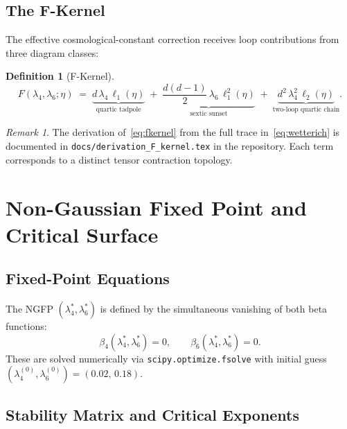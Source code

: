 \documentclass[11pt,a4paper]{article}
\theoremstyle{definition}
\newtheorem{definition}{Definition}[section]
\theoremstyle{plain}
\theoremstyle{remark}
\newtheorem{remark}{Remark}[section]
\begin{document}
\subsection{The F-Kernel}
\label{sec:fkernel}

The effective cosmological-constant correction receives loop
contributions from three diagram classes:

\begin{definition}[F-Kernel]
\label{def:fkernel}
\begin{equation}
  F(\lambda_4,\lambda_6;\eta)
  \;=\;
  \underbrace{d\,\lambda_4\,\ell_1(\eta)}_{\text{quartic tadpole}}
  \;+\;
  \underbrace{\frac{d(d-1)}{2}\,\lambda_6\,\ell_1^2(\eta)}_{\text{sextic sunset}}
  \;+\;
  \underbrace{d^2\,\lambda_4^2\,\ell_2(\eta)}_{\text{two-loop quartic chain}}.
  \label{eq:fkernel}
\end{equation}
\end{definition}

\begin{remark}
The derivation of~\eqref{eq:fkernel} from the full trace
in~\eqref{eq:wetterich} is documented in
\texttt{docs/derivation\_F\_kernel.tex} in the repository.
Each term corresponds to a distinct tensor contraction topology.
\end{remark}


\section{Non-Gaussian Fixed Point and Critical Surface}
\label{sec:ngfp}

\subsection{Fixed-Point Equations}

The NGFP $(\lambda_4^*,\lambda_6^*)$ is defined by the simultaneous
vanishing of both beta functions:
\begin{equation}
  \beta_4(\lambda_4^*,\lambda_6^*) = 0, \qquad
  \beta_6(\lambda_4^*,\lambda_6^*) = 0.
  \label{eq:fp_eqs}
\end{equation}
These are solved numerically via
\texttt{scipy.optimize.fsolve} with initial guess
$(\lambda_4^{(0)},\lambda_6^{(0)})=(0.02,\,0.18)$.

\subsection{Stability Matrix and Critical Exponents}
\end{document}
